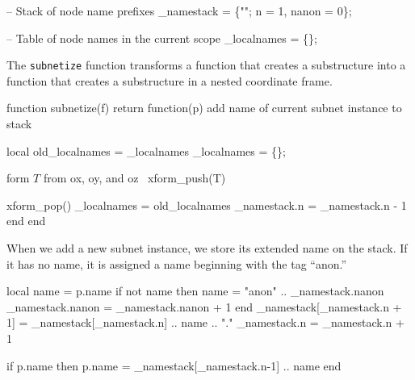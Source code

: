 \nwenddocs{}\endmoddef
-- Stack of node name prefixes
_namestack = \{""; n = 1, nanon = 0\};

-- Table of node names in the current scope
_localnames = \{\};

\nwendcode{}\nwdocspar

The {\tt{}subnetize} function transforms a function that creates a substructure
into a function that creates a substructure in a nested coordinate frame.

\nwenddocs{}\endmoddef
function subnetize(f)
  return function(p)
    \LA{}add name of current subnet instance to stack~{\nwtagstyle{}}\RA{}

    local old_localnames = _localnames
    _localnames = \{\};

    \LA{}form $T$ from \code{}ox\edoc{}, \code{}oy\edoc{}, and \code{}oz\edoc{}~{\nwtagstyle{}}\RA{}
    xform_push(T)


    xform_pop()
    _localnames = old_localnames
    _namestack.n = _namestack.n - 1
  end
end

\nwendcode{}\nwdocspar

When we add a new subnet instance, we store its extended name on
the stack.  If it has no name, it is assigned a name beginning
with the tag ``anon.''

\nwenddocs{}\endmoddef
local name = p.name
if not name then
  name = "anon" .. _namestack.nanon
  _namestack.nanon = _namestack.nanon + 1
end
_namestack[_namestack.n + 1] = _namestack[_namestack.n] .. name .. "."
_namestack.n = _namestack.n + 1

if p.name then
  p.name = _namestack[_namestack.n-1] .. name
end
\nwendcode{}\nwdocspar


